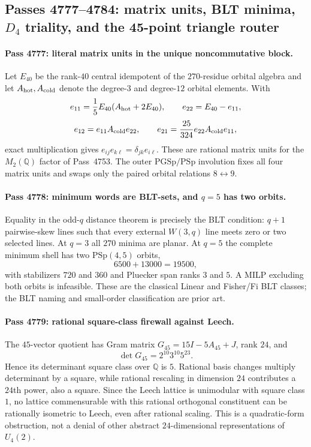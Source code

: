 \subsection*{Passes 4777--4784: matrix units, BLT minima, $D_4$ triality, and the 45-point triangle router}

\paragraph{Pass 4777: literal matrix units in the unique noncommutative block.}
Let $E_{40}$ be the rank-$40$ central idempotent of the $270$-residue orbital algebra and let $A_{\rm hot},A_{\rm cold}$ denote the degree-$3$ and degree-$12$ orbital elements.  With
\[
 e_{11}=\frac15E_{40}(A_{\rm hot}+2E_{40}),\qquad e_{22}=E_{40}-e_{11},
\]
\[
 e_{12}=e_{11}A_{\rm cold}e_{22},\qquad e_{21}=\frac{25}{324}e_{22}A_{\rm cold}e_{11},
\]
exact multiplication gives $e_{ij}e_{k\ell}=\delta_{jk}e_{i\ell}$.  These are rational matrix units for the $M_2(\mathbb Q)$ factor of Pass~4753.  The outer $\mathrm{PGSp}/\mathrm{PSp}$ involution fixes all four matrix units and swaps only the paired orbital relations $8\leftrightarrow9$.

\paragraph{Pass 4778: minimum words are BLT-sets, and $q=5$ has two orbits.}
Equality in the odd-$q$ distance theorem is precisely the BLT condition: $q+1$ pairwise-skew lines such that every external $W(3,q)$ line meets zero or two selected lines.  At $q=3$ all $270$ minima are planar.  At $q=5$ the complete minimum shell has two $\mathrm{PSp}(4,5)$ orbits,
\[
 \boxed{6500+13000=19500},
\]
with stabilizers $720$ and $360$ and Pluecker span ranks $3$ and $5$.  A MILP excluding both orbits is infeasible.  These are the classical Linear and Fisher/Fi BLT classes; the BLT naming and small-order classification are prior art.

\paragraph{Pass 4779: rational square-class firewall against Leech.}
The $45$-vector quotient has Gram matrix $G_{45}=15I-5A_{45}+J$, rank $24$, and
\[
 \det G_{45}=2^{10}3^{10}5^{23}.
\]
Hence its determinant square class over $\mathbb Q$ is $5$.  Rational basis changes multiply determinant by a square, while rational rescaling in dimension $24$ contributes a $24$th power, also a square.  Since the Leech lattice is unimodular with square class $1$, no lattice commensurable with this rational orthogonal constituent can be rationally isometric to Leech, even after rational scaling.  This is a quadratic-form obstruction, not a denial of other abstract $24$-dimensional representations of $U_4(2)$.

